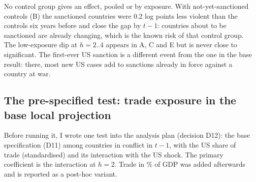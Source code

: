 \documentclass[11pt,a4paper]{article}
\begin{document}
No control group gives an effect, pooled or by exposure. With not-yet-sanctioned controls (B) the sanctioned
countries were 0.2 log points less violent than the controls six years before and close the gap by $t-1$: countries
about to be sanctioned are already changing, which is the known risk of that control group. The low-exposure dip
at $h=2..4$ appears in A, C and E but is never close to significant. The first-ever US sanction is a different event
from the one in the base result: there, most new US cases add to sanctions already in force against a country at war.

\subsection{The pre-specified test: trade exposure in the base local projection}

Before running it, I wrote one test into the analysis plan (decision D12): the base specification (D11) among
countries in conflict in $t-1$, with the US share of trade (standardised) and its interaction with the US shock.
The primary coefficient is the interaction at $h=2$. Trade in \% of GDP was added afterwards and is reported as a
post-hoc variant.
\end{document}

